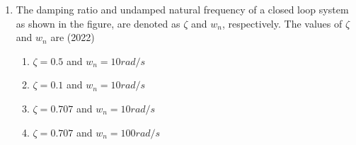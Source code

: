 \documentclass[journal]{IEEEtran}
\begin{document}
\begin{enumerate}

\begin{multicols}{2}
\begin{enumerate}
\item $0$
\item $1$
\item $2$
\item $3$
\end{enumerate}
\end{multicols}


\item The damping ratio and undamped natural frequency of a closed loop system as shown in the figure, are denoted as $\zeta$ and $w_{n}$, respectively. The values of $\zeta$ and $w_{n}$ are \hfill(2022)


\begin{multicols}{2}
\begin{enumerate}
\item $\zeta=0.5$ and $w_{n}=10rad/s$
\item $\zeta=0.1$ and $w_{n}=10rad/s$
\item $\zeta=0.707$ and $w_{n}=10rad/s$
\item $\zeta=0.707$ and $w_{n}=100rad/s$
\end{enumerate}
\end{multicols}
\end{enumerate}
\end{document}
